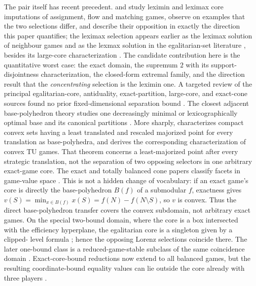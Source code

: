 \documentclass[11pt]{article}
\begin{document}
The pair itself has recent precedent.  \citet{Vazirani2024assignment} and
\citet{GangamEtAl2024} study leximin and leximax core imputations of
assignment, flow and matching games, observe on examples that the two
selections differ, and describe their opposition in exactly the direction
this paper quantifies; the leximax selection appears earlier as the leximax
solution of neighbour games \citep{KlijnEtAl2003} and as the lexmax
solution in the egalitarian-set literature \citep{LlerenaMauri2016},
besides its large-core characterization \citep{ArinKuipersVermeulen2003}.
The candidate contribution here is the quantitative worst case: the exact
domain, the supremum $2$ with its support-disjointness characterization, the
closed-form extremal family, and the direction result that the
\emph{concentrating} selection is the leximin one.  A targeted review of the
principal egalitarian-core, antiduality, exact-partition, large-core, and
exact-cone sources found no prior fixed-dimensional separation bound
\citep{ArinEtAl2008,DietzenbacherYanovskaya2020,StudenyKratochvil2022}.
The closest adjacent base-polyhedron theory studies one decreasingly minimal
or lexicographically optimal base and its canonical partitions
\citep{FrankMurota2022}.  More sharply, \citet{SchootUiterkamp2024}
characterizes compact convex sets having a least translated and rescaled
majorized point for every translation as base-polyhedra, and derives the
corresponding characterization of convex TU games.  That theorem concerns a
least-majorized point after every strategic translation, not the separation
of two opposing selectors in one arbitrary exact-game core.  The exact and
totally balanced cone papers classify
facets in game-value space \citep{KroupaStudeny2019,StudenyKratochvil2022}.
This is not a hidden change of vocabulary: if an exact game's core is directly
the base-polyhedron $B(f)$ of a submodular $f$, exactness gives
$v(S)=\min_{x\in B(f)}x(S)=f(N)-f(N\setminus S)$, so $v$ is convex.  Thus the
direct base-polyhedron transfer covers the convex subdomain, not arbitrary
exact games.
On the special two-bound domain, where the core is a box intersected with the
efficiency hyperplane, the egalitarian core is a singleton given by a clipped-
level formula \citep{GongDietzenbacherPeters2022}; hence the opposing Lorenz
selections coincide there.  The later one-bound class is a reduced-game-stable
subclass of the same coincidence domain \citep{GongDietzenbacherPeters2024}.
Exact-core-bound reductions now extend to all
balanced games, but the resulting coordinate-bound equality values can lie
outside the core already with three players \citep{GongDietzenbacher2026}.
\end{document}
